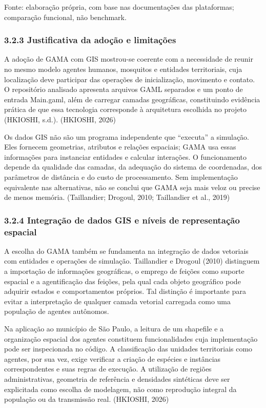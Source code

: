 Fonte: elaboração própria, com base nas documentações das plataformas;
comparação funcional, não benchmark.

\subsubsection{3.2.3 Justificativa da adoção e
limitações}\label{justificativa-da-adouxe7uxe3o-e-limitauxe7uxf5es}

A adoção de GAMA com GIS mostrou-se coerente com a necessidade de reunir
no mesmo modelo agentes humanos, mosquitos e entidades territoriais,
cuja localização deve participar das operações de inicialização,
movimento e contato. O repositório analisado apresenta arquivos GAML
separados e um ponto de entrada Main.gaml, além de carregar camadas
geográficas, constituindo evidência prática de que essa tecnologia
corresponde à arquitetura escolhida no projeto (HKIOSHI, s.d.).
(HKIOSHI, 2026)

Os dados GIS não são um programa independente que ``executa'' a
simulação. Eles fornecem geometrias, atributos e relações espaciais;
GAMA usa essas informações para instanciar entidades e calcular
interações. O funcionamento depende da qualidade das camadas, da
adequação do sistema de coordenadas, dos parâmetros de distância e do
custo de processamento. Sem implementação equivalente nas alternativas,
não se conclui que GAMA seja mais veloz ou precise de menos memória.
(Taillandier; Drogoul, 2010; Taillandier et al., 2019)

\subsubsection{3.2.4 Integração de dados GIS e níveis de representação
espacial}\label{integrauxe7uxe3o-de-dados-gis-e-nuxedveis-de-representauxe7uxe3o-espacial}

A escolha do GAMA também se fundamenta na integração de dados vetoriais
com entidades e operações de simulação. Taillandier e Drogoul (2010)
distinguem a importação de informações geográficas, o emprego de feições
como suporte espacial e a agentificação das feições, pela qual cada
objeto geográfico pode adquirir estados e comportamentos próprios. Tal
distinção é importante para evitar a interpretação de qualquer camada
vetorial carregada como uma população de agentes autônomos.

Na aplicação ao município de São Paulo, a leitura de um shapefile e a
organização espacial dos agentes constituem funcionalidades cuja
implementação pode ser inspecionada no código. A classificação das
unidades territoriais como agentes, por sua vez, exige verificar a
criação de espécies e instâncias correspondentes e suas regras de
execução. A utilização de regiões administrativas, geometria de
referência e densidades sintéticas deve ser explicitada como escolha de
modelagem, não como reprodução integral da população ou da transmissão
real. (HKIOSHI, 2026)

